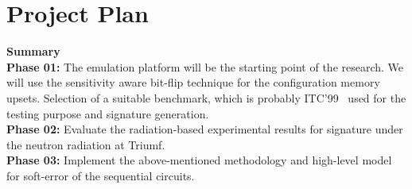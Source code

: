 \section{Project Plan}
\textbf{Summary} \\
\textbf{Phase  01:} The emulation platform will be the starting point of the research. We will use the sensitivity aware bit-flip technique for the configuration memory upsets. Selection of a suitable benchmark, which is probably ITC'99~\citep{ITC} used for the testing purpose and signature generation.\\
\textbf{Phase  02:} Evaluate the radiation-based experimental results for signature under the neutron radiation at Triumf.\\
\textbf{Phase 03:} Implement the above-mentioned methodology and high-level model for soft-error of the sequential circuits.